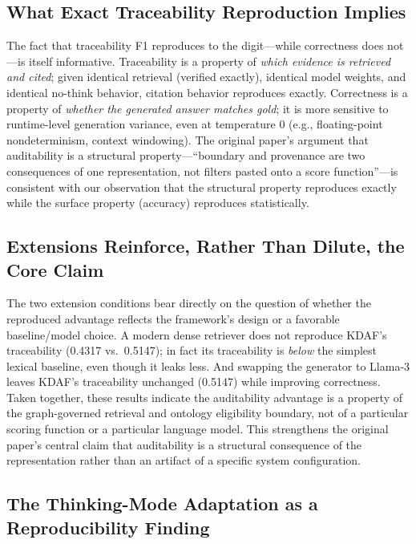 \documentclass[11pt]{article}
\begin{document}
\subsection{What Exact Traceability Reproduction Implies}

The fact that traceability F1 reproduces to the digit---while correctness does not---is itself informative. Traceability is a property of \emph{which evidence is retrieved and cited}; given identical retrieval (verified exactly), identical model weights, and identical no-think behavior, citation behavior reproduces exactly. Correctness is a property of \emph{whether the generated answer matches gold}; it is more sensitive to runtime-level generation variance, even at temperature 0 (e.g., floating-point nondeterminism, context windowing). The original paper's argument that auditability is a structural property---``boundary and provenance are two consequences of one representation, not filters pasted onto a score function''---is consistent with our observation that the structural property reproduces exactly while the surface property (accuracy) reproduces statistically.

\subsection{Extensions Reinforce, Rather Than Dilute, the Core Claim}

The two extension conditions bear directly on the question of whether the reproduced advantage reflects the framework's design or a favorable baseline/model choice. A modern dense retriever does not reproduce KDAF's traceability (0.4317 vs.\ 0.5147); in fact its traceability is \emph{below} the simplest lexical baseline, even though it leaks less. And swapping the generator to Llama-3 leaves KDAF's traceability unchanged (0.5147) while improving correctness. Taken together, these results indicate the auditability advantage is a property of the graph-governed retrieval and ontology eligibility boundary, not of a particular scoring function or a particular language model. This strengthens the original paper's central claim that auditability is a structural consequence of the representation rather than an artifact of a specific system configuration.

\subsection{The Thinking-Mode Adaptation as a Reproducibility Finding}
\end{document}
